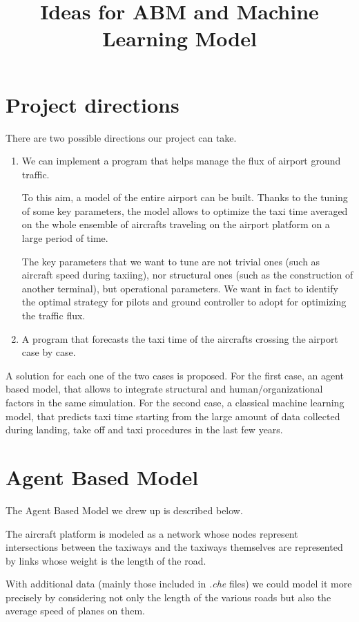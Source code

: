 \documentclass{article}
\begin{document}
	
	\title{Ideas for ABM and Machine Learning Model}
	\maketitle
	
\section*{Project directions}
There are two possible directions our project can take.
\begin{enumerate}
	\item We can implement a program that helps manage the flux of airport ground traffic.
	
	 To this aim, a model of the entire airport can be built. Thanks to the tuning of some key parameters, the model allows to optimize the taxi time averaged on the whole ensemble of aircrafts traveling on the airport platform on a large period of time. 
	
	The key parameters that we want to tune are not trivial ones (such as aircraft speed during taxiing), nor structural ones (such as the construction of another terminal), but operational parameters. We want in fact to identify the optimal strategy for pilots and ground controller to adopt for optimizing the traffic flux.
	
	\item A program that forecasts the taxi time of the aircrafts crossing the airport case by case.
\end{enumerate}
A solution for each one of the two cases is proposed. For the first case, an agent based model, that allows to integrate structural and human/organizational factors in the same simulation. For the second case, a classical machine learning model, that predicts taxi time starting from the large amount of data collected during landing, take off and taxi procedures in the last few years.

\section{Agent Based Model}	
The Agent Based Model we drew up is described below. 

The aircraft platform is modeled as a network whose nodes represent intersections between the taxiways and the taxiways themselves are represented by links whose weight is the length of the road.

With additional data (mainly those included in \textit{.che} files) we could model it more precisely by considering not only the length of the various roads but also the average speed of planes on them.
\end{document}
